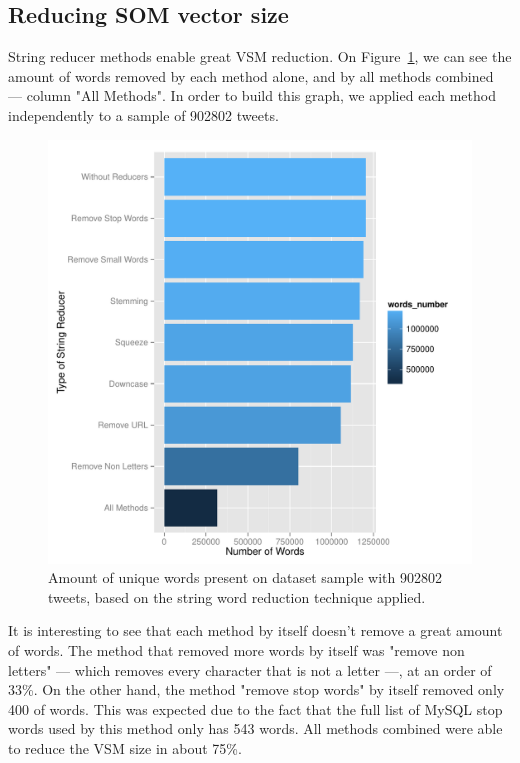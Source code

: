 \documentclass[journal]{IEEEtran}
\begin{document}
\subsection{Reducing SOM vector size}
\label{sub:reducing_som_vector_size}
String reducer methods enable great \ac{VSM} reduction. On Figure~\ref{fig:plot_word_red}, we can see the amount of words removed by each method alone, and by all methods combined --- column "All Methods". In order to build this graph, we applied each method independently to a sample of 902802 tweets.

\begin{figure}[h]
  \centering
  \includegraphics[width=1\linewidth]{./plots/svm/plot_wordcount.pdf}
  \caption{Amount of unique words present on dataset sample with 902802 tweets, based on the string word reduction technique applied.}
  \label{fig:plot_word_red}
\end{figure}

It is interesting to see that each method by itself doesn't remove a great amount of words. The method that removed more words by itself was "remove non letters" --- which removes every character that is not a letter ---, at an order of 33\%. On the other hand, the method "remove stop words" by itself removed only 400 of words. This was expected due to the fact that the full list of MySQL stop words used by this method only has 543 words. All methods combined were able to reduce the \ac{VSM} size in about 75\%.
\end{document}
